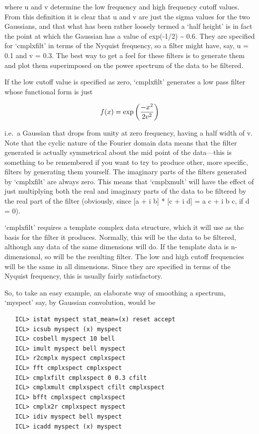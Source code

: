 \documentclass[11pt,twoside]{article}
\newcommand{\latorhtm}[2]{#1}
\newcommand{\latorhtm}[2]{#2}
\begin{document}
   where u and v determine the low frequency and high frequency cutoff
   values. From this definition it is clear that u and v are just the
   sigma values for the two Gaussians, and that what has been rather
   loosely termed a `half height' is in fact the point at which the
   Gaussian has a value of exp(-1/2) \~{} 0.6. They are specified for
   `cmplxfilt' in terms of the Nyquist frequency, so a filter might
   have, say, u = 0.1 and v = 0.3. The best way to get a feel for these
   filters is to generate them and plot them superimposed on the power
   spectrum of the data to be filtered.

   If the low cutoff value is specified as zero, `cmplxfilt' generates
   a low pass filter whose functional form is just

\begin{displaymath}
   f(x) = \exp{\left({{-x^2}\over{2 v^2}}\right)}
\end{displaymath}

   i.e.\ a Gaussian that drops from unity at zero frequency, having a
   half width of v.  Note that the cyclic nature of the Fourier domain
   data means that the filter generated is actually symmetrical about
   the mid point of the data\latorhtm{---}{-}this is something to be
   remembered if you
   want to try to produce other, more specific, filters by generating
   them yourself. The imaginary parts of the filters generated by
   `cmplxfilt' are always zero.  This means that `cmplxmult' will have
   the effect of just multiplying both the real and imaginary parts of
   the data to be filtered by the real part of the filter (obviously,
   since [a + i b] * [c + i d] = a c + i b c, if d = 0).

   `cmplxfilt' requires a template complex data structure, which it will
   use as the basis for the filter it produces.  Normally, this will be
   the data to be filtered, although any data of the same dimensions
   will do. If the template data is n-dimensional, so will be the
   resulting filter.  The low and high cutoff frequencies will be the
   same in all dimensions.  Since they are specified in terms of the
   Nyquist frequency, this is usually fairly satisfactory.

   So, to take an easy example, an elaborate way of smoothing a
   spectrum, `myspect' say, by Gaussian convolution, would be

\begin{verbatim}
   ICL> istat myspect stat_mean=(x) reset accept
   ICL> icsub myspect (x) myspect
   ICL> cosbell myspect 10 bell
   ICL> imult myspect bell myspect
   ICL> r2cmplx myspect cmplxspect
   ICL> fft cmplxspect cmplxspect
   ICL> cmplxfilt cmplxspect 0 0.3 cfilt
   ICL> cmplxmult cmplxspect cfilt cmplxspect
   ICL> bfft cmplxspect cmplxspect
   ICL> cmplx2r cmplxspect myspect
   ICL> idiv myspect bell myspect
   ICL> icadd myspect (x) myspect
\end{verbatim}
\end{document}

